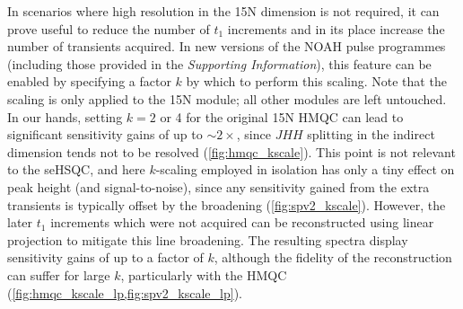 \documentclass[11pt]{article}
\newcommand*{\nitrogen}{15N}
\newcommand*{\jhh}{JHH}
\newcommand*{\SInf}{\textit{Supporting Information}}
\begin{document}
\begin{refsection}
In scenarios where high resolution in the \nitrogen{} dimension is not required, it can prove useful to reduce the number of $t_1$ increments and in its place increase the number of transients acquired.\autocite{Perez-Trujillo2007MRC, Parella2010CMR}
In new versions of the NOAH pulse programmes (including those provided in the \SInf{}), this feature can be enabled by specifying a factor $k$ by which to perform this scaling.
Note that the scaling is only applied to the \nitrogen{} module; all other modules are left untouched.
In our hands, setting $k = 2$ or 4 for the original \nitrogen{} HMQC can lead to significant sensitivity gains of up to $\sim 2\times$, since $\jhh$ splitting in the indirect dimension tends not to be resolved (\cref{fig:hmqc_kscale}).
This point is not relevant to the seHSQC, and here $k$-scaling employed in isolation has only a tiny effect on peak height (and signal-to-noise), since any sensitivity gained from the extra transients is typically offset by the broadening (\cref{fig:spv2_kscale}).
However, the later $t_1$ increments which were not acquired can be reconstructed using linear projection\autocite{linearpred} to mitigate this line broadening.
The resulting spectra display sensitivity gains of up to a factor of $k$, although the fidelity of the reconstruction can suffer for large $k$, particularly with the HMQC (\cref{fig:hmqc_kscale_lp,fig:spv2_kscale_lp}).



\end{refsection}
\end{document}
